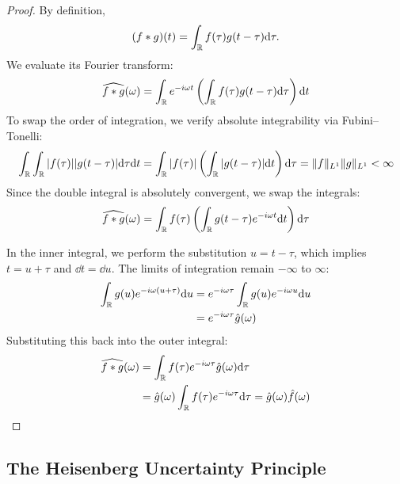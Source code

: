 \begin{proof}
By definition,
\[
(f*g)(t) = \int_{\mathbb{R}} f(\tau) g(t-\tau) \mathrm{d} \tau.
\]
We evaluate its Fourier transform:
\begin{equation}
\widehat{f*g}(\omega) = \int_{\mathbb{R}} e^{-i\omega t} \left( \int_{\mathbb{R}} f(\tau) g(t-\tau) \mathrm{d} \tau \right) \mathrm{d} t
\end{equation}
To swap the order of integration, we verify absolute integrability via Fubini--Tonelli:
\begin{equation}
\int_{\mathbb{R}} \int_{\mathbb{R}} |f(\tau)| |g(t-\tau)| \mathrm{d} \tau \mathrm{d} t = \int_{\mathbb{R}} |f(\tau)| \left( \int_{\mathbb{R}} |g(t-\tau)| \mathrm{d} t \right) \mathrm{d} \tau = \|f\|_{L^1} \|g\|_{L^1} < \infty
\end{equation}
Since the double integral is absolutely convergent, we swap the integrals:
\begin{equation}
\widehat{f*g}(\omega) = \int_{\mathbb{R}} f(\tau) \left( \int_{\mathbb{R}} g(t-\tau) e^{-i\omega t} \mathrm{d} t \right) \mathrm{d} \tau
\end{equation}

In the inner integral, we perform the substitution $u = t-\tau$, which implies $t = u+\tau$ and $\dd t = \dd u$. The limits of integration remain $-\infty$ to $\infty$:
\begin{equation}
\begin{aligned}
\int_{\mathbb{R}} g(u) e^{-i\omega (u+\tau)} \mathrm{d} u &= e^{-i\omega \tau} \int_{\mathbb{R}} g(u) e^{-i\omega u} \mathrm{d} u \\
&= e^{-i\omega \tau} \hat{g}(\omega)
\end{aligned}
\end{equation}
Substituting this back into the outer integral:
\begin{equation}
\begin{aligned}
    \widehat{f*g}(\omega)
    &= \int_{\mathbb{R}} f(\tau) e^{-i\omega \tau} \hat{g}(\omega) \mathrm{d} \tau \\
    &= \hat{g}(\omega) \int_{\mathbb{R}} f(\tau) e^{-i\omega \tau} \mathrm{d} \tau
    = \hat{g}(\omega) \hat{f}(\omega)
    \end{aligned}
\end{equation}

\end{proof}



\subsection{The Heisenberg Uncertainty Principle}


